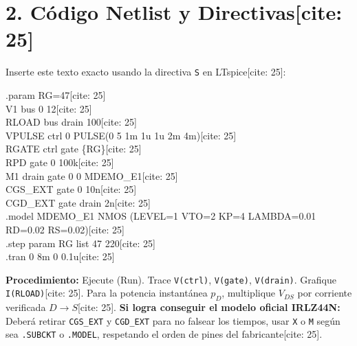 \documentclass[11pt, a4paper]{article}
\begin{document}
\vspace{0.2cm}
\section*{2. Código Netlist y Directivas[cite: 25]}
Inserte este texto exacto usando la directiva \texttt{S} en LTspice[cite: 25]:
\begin{tcolorbox}[colback=black!5, colframe=black, fontupper=\ttfamily, sharp corners]
.param RG=47[cite: 25] \\
V1 bus 0 12[cite: 25] \\
RLOAD bus drain 100[cite: 25] \\
VPULSE ctrl 0 PULSE(0 5 1m 1u 1u 2m 4m)[cite: 25] \\
RGATE ctrl gate \{RG\}[cite: 25] \\
RPD gate 0 100k[cite: 25] \\
M1 drain gate 0 0 MDEMO\_E1[cite: 25] \\
CGS\_EXT gate 0 10n[cite: 25] \\
CGD\_EXT gate drain 2n[cite: 25] \\
.model MDEMO\_E1 NMOS (LEVEL=1 VTO=2 KP=4 LAMBDA=0.01 RD=0.02 RS=0.02)[cite: 25] \\
.step param RG list 47 220[cite: 25] \\
.tran 0 8m 0 0.1u[cite: 25]
\end{tcolorbox}

\textbf{Procedimiento:} Ejecute (Run). Trace \texttt{V(ctrl)}, \texttt{V(gate)}, \texttt{V(drain)}. Grafique \texttt{I(RLOAD)}[cite: 25]. Para la potencia instantánea $p_D$, multiplique $V_{DS}$ por corriente verificada $D \to S$[cite: 25].
\textbf{Si logra conseguir el modelo oficial IRLZ44N:} Deberá retirar \texttt{CGS\_EXT} y \texttt{CGD\_EXT} para no falsear los tiempos, usar \texttt{X} o \texttt{M} según sea \texttt{.SUBCKT} o \texttt{.MODEL}, respetando el orden de pines del fabricante[cite: 25].
\end{document}
